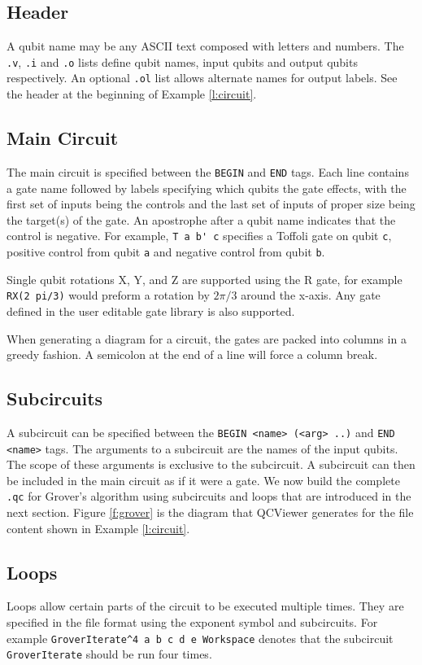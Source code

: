 \documentclass[aps,prl,reprint,floatfix,superscriptaddress]{revtex4-1} %
\begin{document}
\subsection{Header}
A qubit name may be any ASCII text composed with letters and numbers. 
The \verb+.v+, \verb+.i+ and \verb+.o+ lists define qubit names, input qubits and output qubits respectively.
An optional \verb+.ol+ list allows alternate names for output labels.
See the header at the beginning of Example \ref{l:circuit}.

\subsection{Main Circuit}
The main circuit is specified between the \verb+BEGIN+ and \verb+END+ tags.
Each line contains a gate name followed by labels specifying which qubits the gate effects, with the first set of inputs being the controls and the last set of inputs of proper size being the target(s) of the gate.
An apostrophe after a qubit name indicates that the control is negative. 
For example, \verb+T a b' c+ specifies a Toffoli gate on qubit \verb+c+, positive control from qubit \verb+a+ and negative control from qubit \verb+b+. 

Single qubit rotations X, Y, and Z are supported using the R gate, for example \verb+RX(2 pi/3)+ would preform a rotation by $2\pi/3$ around the x-axis. 
Any gate defined in the user editable gate library is also supported.

When generating a diagram for a circuit, the gates are packed into columns in a greedy fashion. 
A semicolon at the end of a line will force a column break.

\subsection{Subcircuits}
A subcircuit can be specified between the \verb+BEGIN <name> (<arg> ..)+ and \verb+END <name>+ tags.
The arguments to a subcircuit are the names of the input qubits.
The scope of these arguments is exclusive to the subcircuit.
A subcircuit can then be included in the main circuit as if it were a gate.
We now build the complete \verb+.qc+ for Grover's algorithm using subcircuits and loops that are introduced in the next section.
Figure \ref{f:grover} is the diagram that QCViewer generates for the file content shown in Example \ref{l:circuit}.

\subsection{Loops}
Loops allow certain parts of the circuit to be executed multiple times. 
They are specified in the file format using the exponent symbol and subcircuits.
For example \verb+GroverIterate^4 a b c d e Workspace+ denotes that the subcircuit \verb+GroverIterate+ should be run four times.
\end{document}
